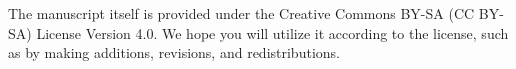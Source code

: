 The manuscript itself is provided under the Creative Commons BY-SA (CC BY-SA) License Version 4.0. We hope you will utilize it according to the license, such as by making additions, revisions, and redistributions.



